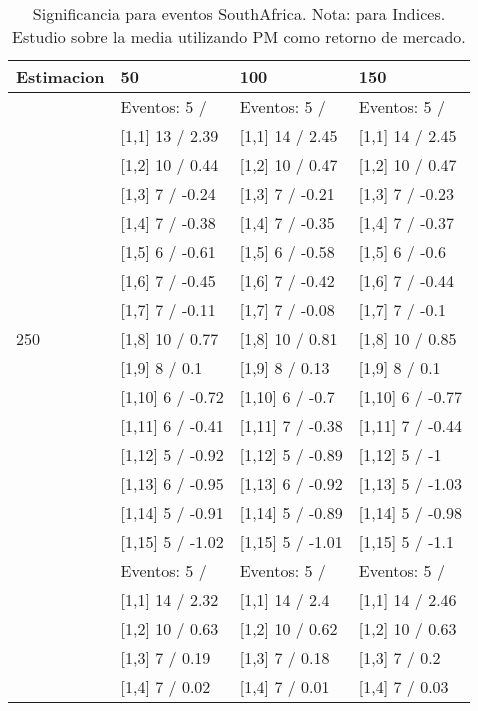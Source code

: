 \begin{table}

\caption{Significancia para eventos SouthAfrica. Nota: para Indices. Estudio sobre la media utilizando PM como retorno de mercado.}
\centering
\begin{tabular}[t]{llll}
\toprule
Estimacion & 50 & 100 & 150\\
\midrule
 & Eventos:  5 / & Eventos:  5 / & Eventos:  5 /\\
 & {}[1,1] 13  / 2.39 & {}[1,1] 14  / 2.45 & {}[1,1] 14  / 2.45\\
 & {}[1,2] 10  / 0.44 & {}[1,2] 10  / 0.47 & {}[1,2] 10  / 0.47\\
 & {}[1,3] 7  / -0.24 & {}[1,3] 7  / -0.21 & {}[1,3] 7  / -0.23\\
 & {}[1,4] 7  / -0.38 & {}[1,4] 7  / -0.35 & {}[1,4] 7  / -0.37\\
\addlinespace
 & {}[1,5] 6  / -0.61 & {}[1,5] 6  / -0.58 & {}[1,5] 6  / -0.6\\
 & {}[1,6] 7  / -0.45 & {}[1,6] 7  / -0.42 & {}[1,6] 7  / -0.44\\
 & {}[1,7] 7  / -0.11 & {}[1,7] 7  / -0.08 & {}[1,7] 7  / -0.1\\
250 & {}[1,8] 10  / 0.77 & {}[1,8] 10  / 0.81 & {}[1,8] 10  / 0.85\\
 & {}[1,9] 8  / 0.1 & {}[1,9] 8  / 0.13 & {}[1,9] 8  / 0.1\\
\addlinespace
 & {}[1,10] 6  / -0.72 & {}[1,10] 6  / -0.7 & {}[1,10] 6  / -0.77\\
 & {}[1,11] 6  / -0.41 & {}[1,11] 7  / -0.38 & {}[1,11] 7  / -0.44\\
 & {}[1,12] 5  / -0.92 & {}[1,12] 5  / -0.89 & {}[1,12] 5  / -1\\
 & {}[1,13] 6  / -0.95 & {}[1,13] 6  / -0.92 & {}[1,13] 5  / -1.03\\
 & {}[1,14] 5  / -0.91 & {}[1,14] 5  / -0.89 & {}[1,14] 5  / -0.98\\
\addlinespace
 & {}[1,15] 5  / -1.02 & {}[1,15] 5  / -1.01 & {}[1,15] 5  / -1.1\\
 & Eventos:  5 / & Eventos:  5 / & Eventos:  5 /\\
 & {}[1,1] 14  / 2.32 & {}[1,1] 14  / 2.4 & {}[1,1] 14  / 2.46\\
 & {}[1,2] 10  / 0.63 & {}[1,2] 10  / 0.62 & {}[1,2] 10  / 0.63\\
 & {}[1,3] 7  / 0.19 & {}[1,3] 7  / 0.18 & {}[1,3] 7  / 0.2\\
\addlinespace
 & {}[1,4] 7  / 0.02 & {}[1,4] 7  / 0.01 & {}[1,4] 7  / 0.03\\

\end{tabular}
\end{table}
